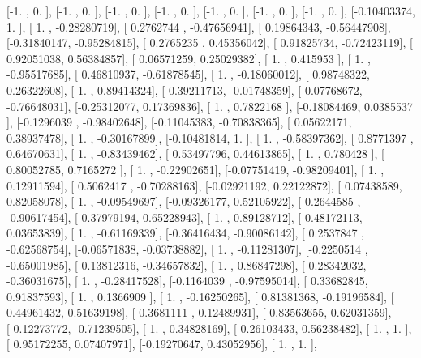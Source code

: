 \documentclass{article}
\begin{document}
       [-1.        ,  0.        ],
       [-1.        ,  0.        ],
       [-1.        ,  0.        ],
       [-1.        ,  0.        ],
       [-1.        ,  0.        ],
       [-1.        ,  0.        ],
       [-1.        ,  0.        ],
       [-0.10403374,  1.        ],
       [ 1.        , -0.28280719],
       [ 0.2762744 , -0.47656941],
       [ 0.19864343, -0.56447908],
       [-0.31840147, -0.95284815],
       [ 0.2765235 ,  0.45356042],
       [ 0.91825734, -0.72423119],
       [ 0.92051038,  0.56384857],
       [ 0.06571259,  0.25029382],
       [ 1.        ,  0.415953  ],
       [ 1.        , -0.95517685],
       [ 0.46810937, -0.61878545],
       [ 1.        , -0.18060012],
       [ 0.98748322,  0.26322608],
       [ 1.        ,  0.89414324],
       [ 0.39211713, -0.01748359],
       [-0.07768672, -0.76648031],
       [-0.25312077,  0.17369836],
       [ 1.        ,  0.7822168 ],
       [-0.18084469,  0.0385537 ],
       [-0.1296039 , -0.98402648],
       [-0.11045383, -0.70838365],
       [ 0.05622171,  0.38937478],
       [ 1.        , -0.30167899],
       [-0.10481814,  1.        ],
       [ 1.        , -0.58397362],
       [ 0.8771397 ,  0.64670631],
       [ 1.        , -0.83439462],
       [ 0.53497796,  0.44613865],
       [ 1.        ,  0.780428  ],
       [ 0.80052785,  0.7165272 ],
       [ 1.        , -0.22902651],
       [-0.07751419, -0.98209401],
       [ 1.        ,  0.12911594],
       [ 0.5062417 , -0.70288163],
       [-0.02921192,  0.22122872],
       [ 0.07438589,  0.82058078],
       [ 1.        , -0.09549697],
       [-0.09326177,  0.52105922],
       [ 0.2644585 , -0.90617454],
       [ 0.37979194,  0.65228943],
       [ 1.        ,  0.89128712],
       [ 0.48172113,  0.03653839],
       [ 1.        , -0.61169339],
       [-0.36416434, -0.90086142],
       [ 0.2537847 , -0.62568754],
       [-0.06571838, -0.03738882],
       [ 1.        , -0.11281307],
       [-0.2250514 , -0.65001985],
       [ 0.13812316, -0.34657832],
       [ 1.        ,  0.86847298],
       [ 0.28342032, -0.36031675],
       [ 1.        , -0.28417528],
       [-0.1164039 , -0.97595014],
       [ 0.33682845,  0.91837593],
       [ 1.        ,  0.1366909 ],
       [ 1.        , -0.16250265],
       [ 0.81381368, -0.19196584],
       [ 0.44961432,  0.51639198],
       [ 0.3681111 ,  0.12489931],
       [ 0.83563655,  0.62031359],
       [-0.12273772, -0.71239505],
       [ 1.        ,  0.34828169],
       [-0.26103433,  0.56238482],
       [ 1.        ,  1.        ],
       [ 0.95172255,  0.07407971],
       [-0.19270647,  0.43052956],
       [ 1.        ,  1.        ],
\end{document}
